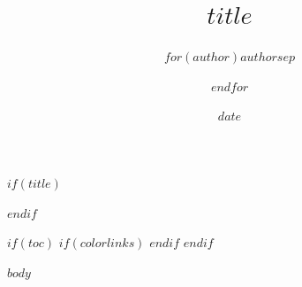 \documentclass[
$if(fontsize)$
  $fontsize$,
$endif$
$if(papersize)$
  $papersize$paper,
$endif$
$for(classoption)$
  $classoption$$sep$,
$endfor$
]{$documentclass$}
\title{$title$}
\author{$for(author)$$author$$sep$ \and $endfor$}
\date{$date$}
\begin{document}
$if(title)$
\maketitle
$endif$

$if(toc)$
{
$if(colorlinks)$
\hypersetup{linkcolor=$if(toccolor)$$toccolor$$else$$endif$}
$endif$
\setcounter{tocdepth}{$toc-depth$}
\tableofcontents
}
$endif$

$body$
\end{document}
